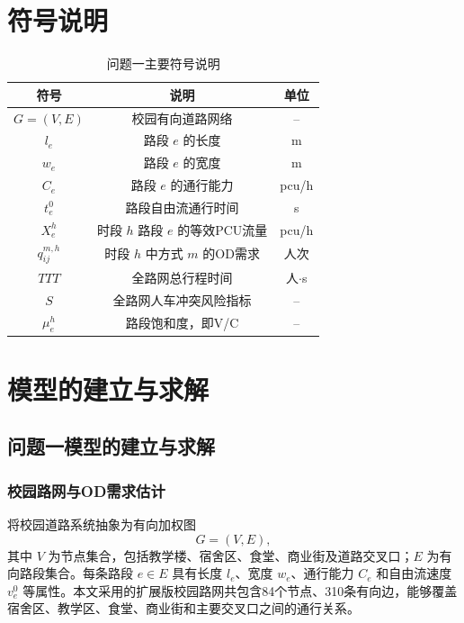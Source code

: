 \documentclass[UTF8,zihao=-4,a4paper]{ctexart}
\begin{document}
\section{符号说明}

\begin{table}[H]
\centering
\caption{问题一主要符号说明}
\label{tab:symbols_q1}
\begin{tabular}{ccc}
\toprule
\textbf{符号} & \textbf{说明} & \textbf{单位} \\
\midrule
$G=(V,E)$ & 校园有向道路网络 & -- \\
$l_e$ & 路段 $e$ 的长度 & m \\
$w_e$ & 路段 $e$ 的宽度 & m \\
$C_e$ & 路段 $e$ 的通行能力 & pcu/h \\
$t_e^0$ & 路段自由流通行时间 & s \\
$X_e^h$ & 时段 $h$ 路段 $e$ 的等效PCU流量 & pcu/h \\
$q_{ij}^{m,h}$ & 时段 $h$ 中方式 $m$ 的OD需求 & 人次 \\
$TTT$ & 全路网总行程时间 & 人$\cdot$s \\
$S$ & 全路网人车冲突风险指标 & -- \\
$\mu_e^h$ & 路段饱和度，即V/C & -- \\
\bottomrule
\end{tabular}
\end{table}

\section{模型的建立与求解}

\subsection{问题一模型的建立与求解}

\subsubsection{校园路网与OD需求估计}

将校园道路系统抽象为有向加权图
\begin{equation}
G=(V,E),
\end{equation}
其中 $V$ 为节点集合，包括教学楼、宿舍区、食堂、商业街及道路交叉口；$E$ 为有向路段集合。每条路段 $e\in E$ 具有长度 $l_e$、宽度 $w_e$、通行能力 $C_e$ 和自由流速度 $v_e^0$ 等属性。本文采用的扩展版校园路网共包含84个节点、310条有向边，能够覆盖宿舍区、教学区、食堂、商业街和主要交叉口之间的通行关系。
\end{document}
